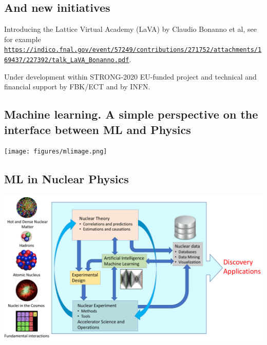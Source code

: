 \documentclass[%
oneside,                 %
final,                   %
10pt]{article}
\begin{document}
\noindent
\subsection{And new initiatives}

Introducing the Lattice Virtual Academy (LaVA) by Claudio Bonanno et al, see for example \href{{https://indico.fnal.gov/event/57249/contributions/271752/attachments/169437/227392/talk_LaVA_Bonanno.pdf}}{\nolinkurl{https://indico.fnal.gov/event/57249/contributions/271752/attachments/169437/227392/talk_LaVA_Bonanno.pdf}}.

Under development within STRONG-2020 EU-funded project and technical and financial support by FBK/ECT and by INFN.

\subsection{Machine learning. A simple perspective on the interface between ML and Physics}

\vspace{6mm}

\centerline{\texttt{[image: figures/mlimage.png]}}

\vspace{6mm}

\subsection{ML in Nuclear  Physics}

\vspace{6mm}

\centerline{\includegraphics[width=1.0\linewidth]{figures/ML-NP.pdf}}

\vspace{6mm}
\end{document}
